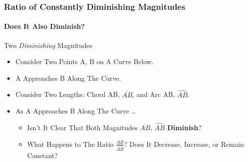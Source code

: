 \documentclass{beamer}
\begin{document}
\begin{frame}
\frametitle{Ratio of Constantly Diminishing Magnitudes}
\framesubtitle{Does It Also Diminish?}
\label{slide:dimmag}
\begin{example}{Two \textit{Diminishing} Magnitudes}
\label{ex:dimlengths}
\begin{itemize}
\pause
\item Consider Two Points A, B on A Curve Below.
\pause
\item A Approaches B Along The Curve.
\pause
\item Consider Two Lengths: Chord AB, $\overline{AB}$, and Arc AB, $\widehat{AB}$.
\pause
\item As A Approaches B Along The Curve \dots
\begin{itemize}
\pause
\item Isn't It Clear That \alert{Both Magnitudes} $\overline{AB}$, $\widehat{AB}$ \alert{\textbf{Diminish}}?
\pause
\item What Happens to \alert{The Ratio $\frac{\overline{AB}}{\widehat{AB}}$}? Does It \alert{Decrease, Increase, or Remain Constant}?
\end{itemize}
\end{itemize}
\end{example}
\end{frame}
\end{document}
